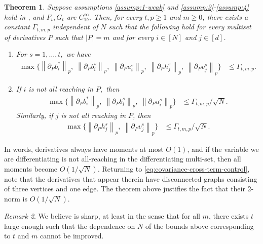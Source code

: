 \documentclass{article}
\newcommand{\1}{\mathbbm{1}}
\newcommand{\norm}[1]{\left\lVert#1\right\rVert}
\theoremstyle{plain}
\newtheorem{theorem}{Theorem}[section]
\theoremstyle{definition}
\theoremstyle{remark}
\newtheorem{remark}[theorem]{Remark}
\begin{document}
\begin{theorem}\label{thm:derivative-bounds}
    Suppose assumptions \eqref{assump:1-weak} and \eqref{assump:2}-\eqref{assump:4} hold in , and $F_t,G_t$ are $C^\infty_{1b}.$  Then, for every $t,p\geq 1$ and $m \geq 0$, there exists a constant $\Gamma_{t,m,p}$ independent of $N$ such that the following hold for every multiset of derivatives $P$ such that $|P|=m$ and for every $i \in [N]$ and $j \in [d]$.
    \begin{enumerate}
        \item For $s=1,\dots,t,$ we have
        \begin{align*}
            \max\{\norm{\partial_P b^*_i}_p,\; \norm{\partial_P b^s_i}_p, \; \norm{\partial_P u^s_i}_p,\; \norm{\partial_P h^s_j}_p,\; \norm{\partial_P v^s_j}_p \} &\leq \Gamma_{t,m,p}.
        \end{align*}
        \item If $i$ is not all reaching in $P,$ then
        \begin{align*}
            \max\{\norm{\partial_P b^*_i}_p,\; \norm{\partial_P b^s_i}_p, \; \norm{\partial_P u^s_i}_p\} &\leq \Gamma_{t,m,p}/\sqrt{N}.
        \end{align*}
        Similarly, if $j$ is not all reaching in $P$, then
        \begin{align*}
            \max\{\norm{\partial_P h^s_j}_p,\; \norm{\partial_P v^s_j}_p \} &\leq \Gamma_{t,m,p}/\sqrt{N}.
        \end{align*}
    \end{enumerate}
\end{theorem}
In words, derivatives always have moments at most $O(1)$, and if the variable we are differentiating is not all-reaching in the differentiating multi-set, then all moments become $O(1/\sqrt{N}).$ Returning to \eqref{eq:covariance-cross-term-control}, note that the derivatives that appear therein have disconnected graphs consisting of three vertices and one edge. The theorem above justifies the fact that their 2-norm is $O(1/\sqrt{N}).$
\begin{remark}
    We believe  is sharp, at least in the sense that for all $m$, there exists $t$ large enough such that the dependence on $N$ of the bounds above corresponding to $t$ and $m$ cannot be improved.
\end{remark}
\end{document}

